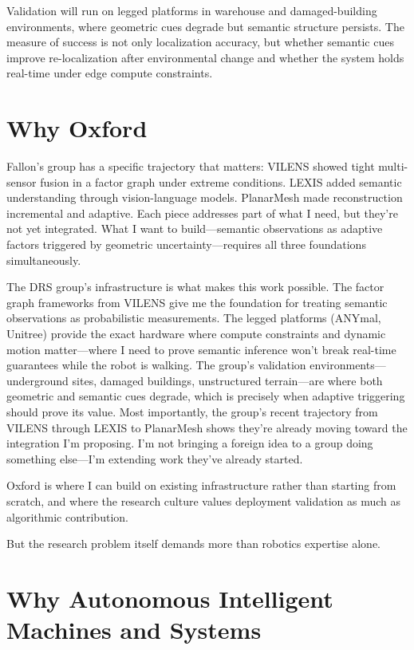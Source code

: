 \documentclass[11pt,a4paper]{article}
\begin{document}
Validation will run on legged platforms in warehouse and 
damaged-building environments, where geometric cues degrade but 
semantic structure persists. The measure of success is not only 
localization accuracy, but whether semantic cues improve 
re-localization after environmental change and whether the system 
holds real-time under edge compute constraints.

\section*{Why Oxford}

Fallon's group has a specific trajectory that matters: VILENS \cite{wisth2022vilens} showed tight multi-sensor fusion in a factor graph under extreme conditions. LEXIS \cite{kassab2024lexis} added semantic understanding through vision-language models. PlanarMesh \cite{wang2025planarmesh} made reconstruction incremental and adaptive. Each piece addresses part of what I need, but they're not yet integrated. What I want to build—semantic observations as adaptive factors triggered by geometric uncertainty—requires all three foundations simultaneously.

The DRS group's infrastructure is what makes this work possible. The factor graph frameworks from VILENS give me the foundation for treating semantic observations as probabilistic measurements. The legged platforms (ANYmal, Unitree) provide the exact hardware where compute constraints and dynamic motion matter—where I need to prove semantic inference won't break real-time guarantees while the robot is walking. The group's validation environments—underground sites, damaged buildings, unstructured terrain—are where both geometric and semantic cues degrade, which is precisely when adaptive triggering should prove its value. Most importantly, the group's recent trajectory from VILENS through LEXIS to PlanarMesh shows they're already moving toward the integration I'm proposing. I'm not bringing a foreign idea to a group doing something else—I'm extending work they've already started.

Oxford is where I can build on existing infrastructure rather than starting from scratch, and where the research culture values deployment validation as much as algorithmic contribution.

But the research problem itself demands more than robotics expertise alone.

\section*{Why Autonomous Intelligent Machines and Systems}
\end{document}
